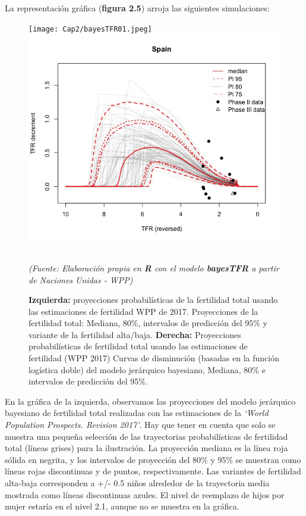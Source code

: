 \newpage
La representación gráfica (\textbf{figura 2.5}) arroja las siguientes simulaciones:

\begin{figure}[!ht]
\centering
\hspace*{-1cm}
\texttt{[image: Cap2/bayesTFR01.jpeg]}\includegraphics[scale=0.4]{Cap2/bayesTFR02.jpeg}
\captionsetup{width=1.05\linewidth}
\vspace{-0.7cm}
\caption[Proyecciones probabilísticas de la fertilidad total usando estimaciones de fertilidad WPP de 2017]{\textbf{Izquierda:} proyecciones probabilísticas de la fertilidad total usando las estimaciones de fertilidad WPP de 2017. Proyecciones de la fertilidad total: Mediana, 80\%, intervalos de predicción del 95\% y variante de la fertilidad alta/baja. \textbf{Derecha:} Proyecciones probabilísticas de fertilidad total usando las estimaciones de fertilidad (WPP 2017) Curvas de disminución (basadas en la función logística doble) del modelo jerárquico bayesiano, Mediana, 80\% e intervalos de predicción del 95\%.}\\
\textit{(Fuente: Elaboración propia en \textbf{R} con el modelo \textbf{bayesTFR} a partir de Naciones Unidas - WPP)}
\end{figure}

En la gráfica de la izquierda, observamos las proyecciones del modelo jerárquico bayesiano de fertilidad total realizadas con las estimaciones de la \textit{`World Population Prospects. Revision 2017'}. Hay que tener en cuenta que solo se muestra una pequeña selección de las trayectorias probabilísticas de fertilidad total (líneas grises) para la ilustración. La proyección mediana es la línea roja sólida en negrita, y los intervalos de proyección del 80\% y 95\% se muestran como líneas rojas discontinuas y de puntos, respectivamente. Las variantes de fertilidad alta-baja corresponden a +/- 0.5 niños alrededor de la trayectoria media mostrada como líneas discontinuas azules. El nivel de reemplazo de hijos por mujer estaría en el nivel 2.1, aunque no se muestra en la gráfica.\\

